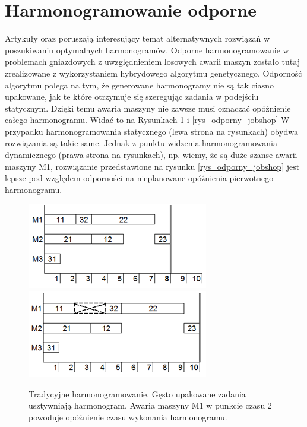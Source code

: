 \documentclass[printmode,oneside]{mgr}
\begin{document}
\section{Harmonogramowanie odporne}
Artykuły \cite{RFJSRMB_ElMekkawy11} oraz \cite{RFJSRMB_Chen} poruszają interesujący temat alternatywnych rozwiązań w poszukiwaniu optymalnych harmonogramów. Odporne harmonogramowanie w problemach gniazdowych z uwzględnieniem losowych awarii maszyn \cite{RFJSRMB_ElMekkawy11} zostało tutaj zrealizowane z wykorzystaniem hybrydowego algorytmu genetycznego. Odporność algorytmu polega na tym, że generowane harmonogramy nie są tak ciasno upakowane, jak te które otrzymuje się szeregując zadania w podejściu statycznym. Dzięki temu awaria maszyny nie zawsze musi oznaczać opóźnienie całego harmonogramu. Widać to na Rysunkach \ref{rys_tradycyjny_jobshop} i \ref{rys_odporny_jobshop} W przypadku harmonogramowania statycznego (lewa strona na rysunkach) obydwa rozwiązania są takie same. Jednak z punktu widzenia harmonogramowania dynamicznego (prawa strona na rysunkach), np. wiemy, że są duże szanse awarii maszyny M1, rozwiązanie przedstawione na rysunku \ref{rys_odporny_jobshop} jest lepsze pod względem odporności na nieplanowane opóźnienia pierwotnego harmonogramu.
\begin{figure}[!ht]
\begin{center}
\includegraphics[width=1.0\linewidth]{rysunki/tradycyjny_jobshopA.png}
\endminipage \hfill
{}%
\includegraphics[width=1.0\linewidth]{rysunki/tradycyjny_jobshopB.png}
\endminipage
\caption[Tradycyjne harmonogramowanie]{Tradycyjne harmonogramowanie. Gęsto upakowane zadania usztywniają harmonogram. Awaria maszyny M1 w punkcie czasu 2 powoduje opóźnienie czasu wykonania harmonogramu.}
\label{rys_tradycyjny_jobshop}
\end{center}
\end{figure}
\end{document}
